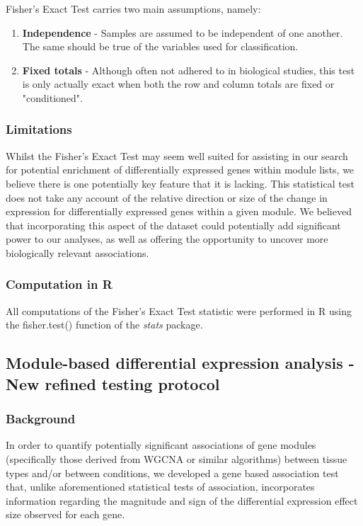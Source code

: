 Fisher's Exact Test carries two main assumptions, namely: 

\begin{enumerate}
    \item \textbf{Independence} - Samples are assumed to be independent of one another. The same should be true of the variables used for classification. 
    \item \textbf{Fixed totals} - Although often not adhered to in biological studies, this test is only actually exact when both the row and column totals are fixed or "conditioned". 
\end{enumerate}

\subsubsection{Limitations}

Whilst the Fisher's Exact Test may seem well suited for assisting in our search for potential enrichment of differentially expressed genes within module lists, we believe there is one potentially key feature that it is lacking. This statistical test does not take any account of the relative direction or size of the change in expression for differentially expressed genes within a given module. We believed that incorporating this aspect of the dataset could potentially add significant power to our analyses, as well as offering the opportunity to uncover more biologically relevant associations. 

\subsubsection{Computation in R} 

All computations of the Fisher's Exact Test statistic were performed in R using the fisher.test() function of the \textit{stats} package. 

\subsection{Module-based differential expression analysis - New refined testing protocol}

\subsubsection{Background}

In order to quantify potentially significant associations of gene modules (specifically those derived from WGCNA or similar algorithms) between tissue types and/or between conditions, we developed a gene based association test that, unlike aforementioned statistical tests of association, incorporates information regarding the magnitude and sign of the differential expression effect size observed for each gene.


